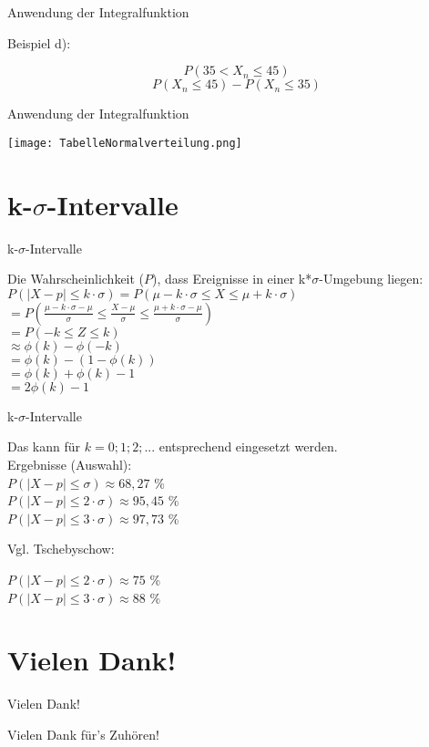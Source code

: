 \documentclass[14pt]{beamer}
\begin{document}
\begin{frame} {Anwendung der Integralfunktion}

Beispiel d):
 
 $$P(35 < X_n \le 45)$$
 $$P(X_n \le 45) - P(X_n \le 35)$$

\end{frame}

\begin{frame} {Anwendung der Integralfunktion}
 
 \texttt{[image: TabelleNormalverteilung.png]}

\end{frame}

\section{k-$\sigma$-Intervalle}

\begin{frame}{k-$\sigma$-Intervalle}

Die Wahrscheinlichkeit ($P$), dass Ereignisse in einer k*$\sigma$-Umgebung liegen:
$ P(|X-p|\le k\cdot\sigma) = P(\mu-k\cdot\sigma\le X \le \mu + k\cdot\sigma)$\\
$ = P\left(\frac{\mu-k\cdot\sigma - \mu}{\sigma}\le \frac{X - \mu}{\sigma}\le \frac{\mu + k\cdot\sigma - \mu}{\sigma}\right)$\\
$ = P(-k \le Z \le k)$\\
$ \approx \phi(k) - \phi(-k)$\\
$ = \phi(k) - (1 - \phi(k))$\\
$ = \phi(k) + \phi(k) - 1$\\
$ = 2\phi(k)- 1$\\

\end{frame}

\begin{frame}{k-$\sigma$-Intervalle}

Das kann für $ k = {0;1;2;...}$ entsprechend eingesetzt werden.
 \\
Ergebnisse (Auswahl):
 \\
$ P(|X-p|\le \sigma) \approx 68,27$ \%\\
$ P(|X-p|\le 2\cdot\sigma) \approx 95,45$ \%\\
$ P(|X-p|\le 3\cdot\sigma) \approx 97,73$ \%

Vgl. Tschebyschow:

$ P(|X-p|\le 2\cdot\sigma) \approx 75$ \%\\
$ P(|X-p|\le 3\cdot\sigma) \approx 88$ \%\\

\end{frame}

\section{Vielen Dank!}
\begin{frame}{Vielen Dank!}
\begin{center}
\parskip 15pt
Vielen Dank für's Zuhören!
\end{center}
\end{frame}
\end{document}
